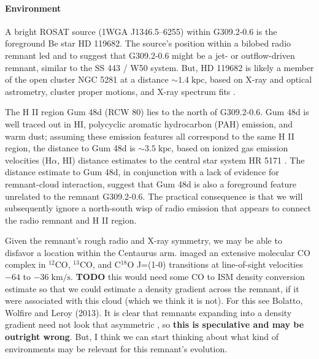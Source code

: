 \documentclass[preprint2,tighten,trackchanges]{aastex6}
\newcommand*{\mt}{\mathrm}
\newcommand*{\unit}[1]{\;\mt{#1}}  %
\newcommand*{\abt}{\mathord{\sim}} %
\newcommand*{\nH}{n_{\mathrm{H}}}
\begin{document}
\paragraph{Environment}

A bright ROSAT source (1WGA J1346.5--6255) within G309.2-0.6 is the foreground
Be star HD 119682.
The source's position within a bilobed radio remnant led
 and  to suggest that
G309.2-0.6 might be a jet- or outflow-driven remnant, similar to the SS 443 /
W50 system.
But, HD 119682 is likely a member of the open cluster NGC 5281 at a distance
$\abt 1.4 \unit{kpc}$, based on X-ray and optical astrometry, cluster proper
motions, and X-ray spectrum fits \citep{rakowski2006, safi-harb2007,
torrejon2013}.

The H II region Gum 48d (RCW 80) lies to the north of G309.2-0.6.
Gum 48d is well traced out in HI, polycyclic aromatic hydrocarbon (PAH)
emission, and warm dust; assuming these emission features all correspond to the
same H II region, the distance to Gum 48d is $\abt 3.5\unit{kpc}$, based on
ionized gas emission velocities (H$\alpha$, HI) distance estimates to the
central star system HR 5171 \citep{karr2009}.
The distance estimate to Gum 48d, in conjunction with a lack of evidence for
remnant-cloud interaction, suggest that Gum 48d is also a foreground feature
unrelated to the remnant G309.2-0.6.  The practical consequence is that we will
subsequently ignore a north-south wisp of radio emission that appears to
connect the radio remnant and H II region.

Given the remnant's rough radio and X-ray symmetry, we may be able to disfavor
a location within the Centaurus arm.  \citet{saito2001} imaged
an extensive molecular CO complex in ${}^{12}$CO, ${}^{13}$CO, and C${}^{18}$O
J=(1-0) transitions at line-of-sight velocities $-64$ to $-36 \unit{km/s}$.
\textbf{TODO} this would need some CO to ISM density conversion estimate so
that we could estimate a density gradient across the remnant, if it were
associated with this cloud (which we think it is not).
For this see Bolatto, Wolfire and Leroy (2013).
It is clear that remnants expanding into a density gradient need not look that
asymmetric \citep{williams2013}, so \textbf{this is speculative and may be
outright wrong}.
But, I think we can start thinking about what kind of environments may be
relevant for this remnant's evolution.
%
\end{document}
